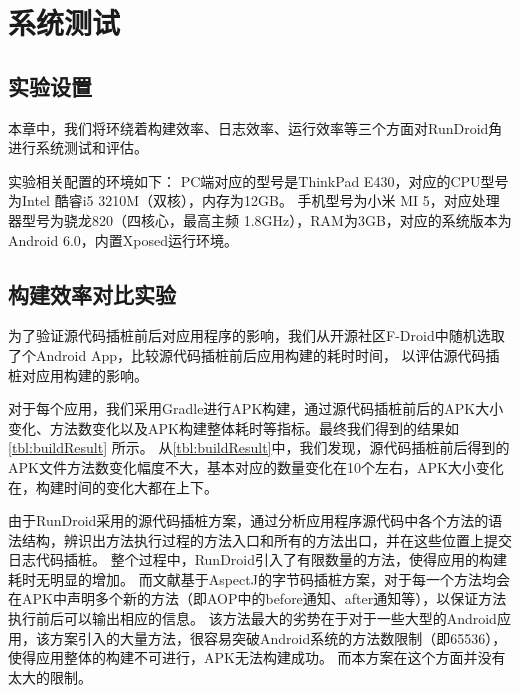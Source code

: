 \chapter{系统测试}  
\label{chp:testing}


\section{实验设置}

本章中，我们将环绕着构建效率、日志效率、运行效率等三个方面对RunDroid角进行系统测试和评估。

实验相关配置的环境如下：
PC端对应的型号是ThinkPad E430，对应的CPU型号为Intel 酷睿i5 3210M（双核），内存为12GB。
手机型号为小米 MI 5，对应处理器型号为骁龙820（四核心，最高主频 1.8GHz），RAM为3GB，对应的系统版本为Android 6.0，内置Xposed运行环境。


\section{构建效率对比实验}
为了验证源代码插桩前后对应用程序的影响，我们从开源社区F-Droid中随机选取了个Android App，比较源代码插桩前后应用构建的耗时时间，
以评估源代码插桩对应用构建的影响。

对于每个应用，我们采用Gradle进行APK构建，通过源代码插桩前后的APK大小变化、方法数变化以及APK构建整体耗时等指标。最终我们得到的结果如 \autoref{tbl:buildResult} 所示。
从\autoref{tbl:buildResult}中，我们发现，源代码插桩前后得到的APK文件方法数变化幅度不大，基本对应的数量变化在10个左右，APK大小变化在，构建时间的变化大都在上下。

由于RunDroid采用的源代码插桩方案，通过分析应用程序源代码中各个方法的语法结构，辨识出方法执行过程的方法入口和所有的方法出口，并在这些位置上提交日志代码插桩。
整个过程中，RunDroid引入了有限数量的方法，使得应用的构建耗时无明显的增加。
而文献\cite{van2013dynamic}基于AspectJ的字节码插桩方案，对于每一个方法均会在APK中声明多个新的方法（即AOP中的before通知、after通知等），以保证方法执行前后可以输出相应的信息。
该方法最大的劣势在于对于一些大型的Android应用，该方案引入的大量方法，很容易突破Android系统的方法数限制（即65536），使得应用整体的构建不可进行，APK无法构建成功。
而本方案在这个方面并没有太大的限制。


